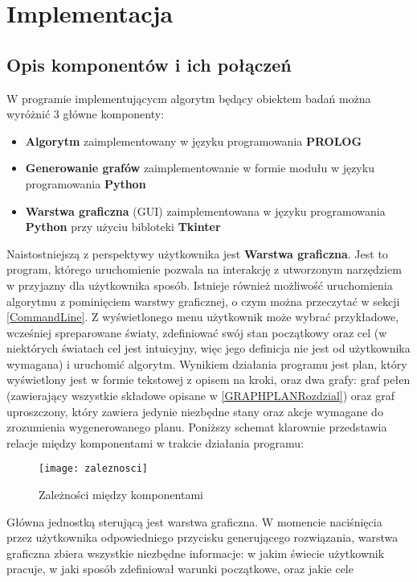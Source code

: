 \chapter{Implementacja}
\thispagestyle{chapterBeginStyle}

\section{Opis komponentów i ich połączeń}
    W programie implementującycm algorytm będący obiektem badań można wyróżnić 3 główne komponenty:
    \begin{itemize}
        \item \textbf{Algorytm} zaimplementowany w języku programowania \textbf{PROLOG}
        \item \textbf{Generowanie grafów} zaimplementowanie w formie modułu w języku programowania \textbf{Python}
        \item \textbf{Warstwa graficzna} (GUI) zaimplementowana w języku programowania \textbf{Python} przy użyciu bibloteki \textbf{Tkinter}
    \end{itemize}
    Naistostniejszą z perspektywy użytkownika jest \textbf{Warstwa graficzna}. Jest to program, którego uruchomienie pozwala na 
    interakcję z utworzonym narzędziem w przyjazny dla użytkownika sposób. Istnieje również możliwość uruchomienia algorytmu z pominięciem 
    warstwy graficznej, o czym można przeczytać w sekcji \ref{CommandLine}.
    Z wyświetlonego menu użytkownik może wybrać przykładowe, wcześniej spreparowane światy, zdefiniować swój stan początkowy oraz cel (w niektórych 
    światach cel jest intuicyjny, więc jego definicja nie jest od użytkownika wymagana) i uruchomić algorytm. Wynikiem działania programu jest 
    plan, który wyświetlony jest w formie tekstowej z opisem na kroki, oraz dwa grafy: graf pełen (zawierający wszystkie składowe opisane 
    w \ref{GRAPHPLANRozdzial}) oraz graf uproszczony, który zawiera jedynie niezbędne stany oraz akcje wymagane do zrozumienia wygenerowanego planu.
    Poniższy schemat klarownie przedstawia relacje między komponentami w trakcie działania programu:
    \begin{figure}[H]
        \texttt{[image: zaleznosci]}
        \centering
        \caption{Zależności między komponentami}
    \end{figure}
    Główna jednostką sterującą jest warstwa graficzna. W momencie naciśnięcia przez użytkownika odpowiedniego przycisku generującego rozwiązania, warstwa 
    graficzna zbiera wszystkie niezbędne informacje: w jakim świecie użytkownik pracuje, w jaki sposób zdefiniował warunki początkowe, oraz jakie cele 
